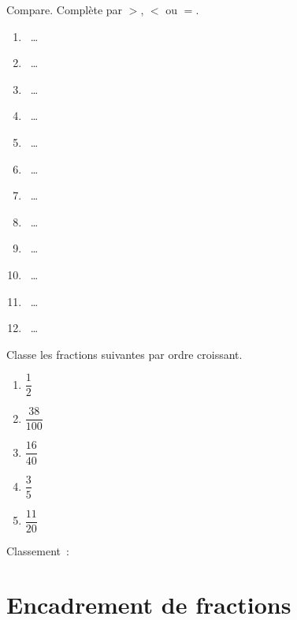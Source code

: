 \documentclass[../../syllabus_2.tex]{subfiles}
\begin{document}
\newpage
\begin{exercise}
  Compare. Complète par $>$, $<$ ou $=$.
  \begin{enumerate}[cols=3]
    \item {}~\dots~
    \item {}~\dots~
    \item {}~\dots~
    \item {}~\dots~
    \item {}~\dots~
    \item {}~\dots~
    \item {}~\dots~
    \item {}~\dots~
    \item {}~\dots~
    \item {}~\dots~
    \item {}~\dots~
    \item {}~\dots~
  \end{enumerate}
\end{exercise}

\vspace{1cm}
\begin{exercise}
  Classe les fractions suivantes par ordre croissant.
  \begin{enumerate}[label=, cols=5]
    \item $\dfrac{1}{2}$
    \item $\dfrac{38}{100}$
    \item $\dfrac{16}{40}$
    \item $\dfrac{3}{5}$
    \item $\dfrac{11}{20}$
  \end{enumerate}
  \vspace{2cm}
  Classement~:
\end{exercise}

\newpage
\section{Encadrement de fractions}
\end{document}
